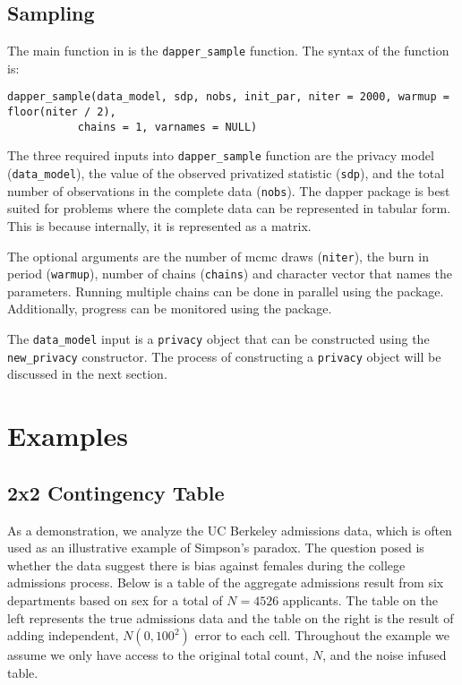 \hypertarget{sampling}{%
\subsection{Sampling}\label{sampling}}

The main function in  is the \texttt{dapper\_sample} function. The syntax of the function is:

\begin{verbatim}
dapper_sample(data_model, sdp, nobs, init_par, niter = 2000, warmup = floor(niter / 2),
           chains = 1, varnames = NULL)
\end{verbatim}

The three required inputs into \texttt{dapper\_sample} function are the privacy model (\texttt{data\_model}), the value
of the observed privatized statistic (\texttt{sdp}), and the total number of observations
in the complete data (\texttt{nobs}). The dapper
package is best suited for problems where the complete data can be represented in
tabular form. This is because internally, it is represented as a matrix.

The optional arguments are the number of mcmc draws (\texttt{niter}), the
burn in period (\texttt{warmup}), number of chains (\texttt{chains}) and character
vector that names the parameters. Running multiple chains can be done in parallel
using the  package. Additionally, progress can be monitored
using the  package.

The \texttt{data\_model} input is a \texttt{privacy}
object that can be constructed using the \texttt{new\_privacy} constructor. The
process of constructing a \texttt{privacy} object will be discussed in the next section.

\hypertarget{examples}{%
\section{Examples}\label{examples}}

\hypertarget{x2-contingency-table}{%
\subsection{2x2 Contingency Table}\label{x2-contingency-table}}

As a demonstration, we analyze the UC Berkeley admissions data, which is often
used as an illustrative example of Simpson's paradox. The question posed is whether
the data suggest there is bias against females during the college admissions
process. Below is a table of the aggregate admissions result from six departments based on sex
for a total of \(N = 4526\) applicants. The table on the left represents
the true admissions data and the table on the right is the result of adding
independent, \(N(0,100^2)\) error to each cell. Throughout the example
we assume we only have access to the original total count, \(N\), and
the noise infused table.

